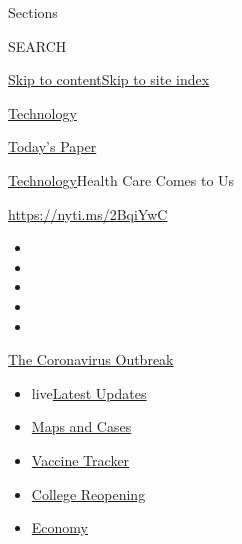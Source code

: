 Sections

SEARCH

\protect\hyperlink{site-content}{Skip to
content}\protect\hyperlink{site-index}{Skip to site index}

\href{https://www.nytimes3xbfgragh.onion/section/technology}{Technology}

\href{https://myaccount.nytimes3xbfgragh.onion/auth/login?response_type=cookie\&client_id=vi}{}

\href{https://www.nytimes3xbfgragh.onion/section/todayspaper}{Today's
Paper}

\href{/section/technology}{Technology}\textbar{}Health Care Comes to Us

\href{https://nyti.ms/2BqiYwC}{https://nyti.ms/2BqiYwC}

\begin{itemize}
\item
\item
\item
\item
\item
\end{itemize}

\href{https://www.nytimes3xbfgragh.onion/news-event/coronavirus?action=click\&pgtype=Article\&state=default\&region=TOP_BANNER\&context=storylines_menu}{The
Coronavirus Outbreak}

\begin{itemize}
\tightlist
\item
  live\href{https://www.nytimes3xbfgragh.onion/2020/08/04/world/coronavirus-covid-19.html?action=click\&pgtype=Article\&state=default\&region=TOP_BANNER\&context=storylines_menu}{Latest
  Updates}
\item
  \href{https://www.nytimes3xbfgragh.onion/interactive/2020/us/coronavirus-us-cases.html?action=click\&pgtype=Article\&state=default\&region=TOP_BANNER\&context=storylines_menu}{Maps
  and Cases}
\item
  \href{https://www.nytimes3xbfgragh.onion/interactive/2020/science/coronavirus-vaccine-tracker.html?action=click\&pgtype=Article\&state=default\&region=TOP_BANNER\&context=storylines_menu}{Vaccine
  Tracker}
\item
  \href{https://www.nytimes3xbfgragh.onion/2020/08/02/us/covid-college-reopening.html?action=click\&pgtype=Article\&state=default\&region=TOP_BANNER\&context=storylines_menu}{College
  Reopening}
\item
  \href{https://www.nytimes3xbfgragh.onion/live/2020/08/03/business/stock-market-today-coronavirus?action=click\&pgtype=Article\&state=default\&region=TOP_BANNER\&context=storylines_menu}{Economy}
\end{itemize}

